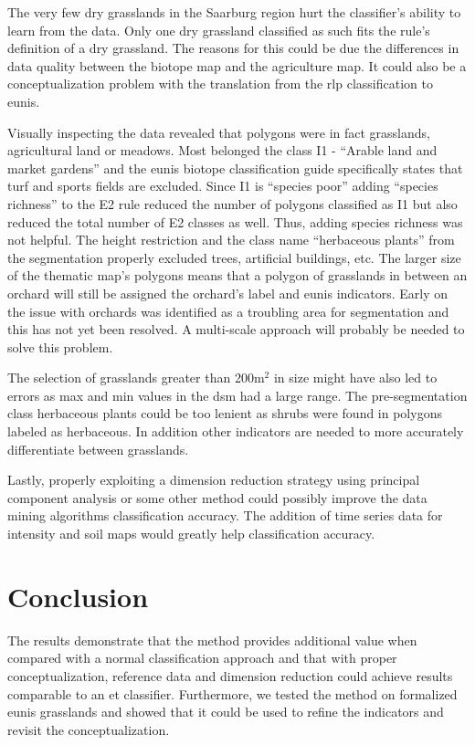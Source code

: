 \documentclass[authoryear,review,12pt,number]{elsarticle}
\begin{document}
The very few dry grasslands in the Saarburg region hurt the classifier's 
ability to learn from the data. Only one dry grassland classified as such fits 
the rule's definition of a dry grassland. The reasons for this could be due the 
differences in data quality between the biotope map and the agriculture map. 
It could also be a conceptualization problem with the translation from the 
\gls{rlp} classification to \gls{eunis}.

Visually inspecting the data revealed that polygons were in fact grasslands, 
agricultural land or meadows. Most belonged the class I1 - ``Arable land and 
market gardens'' and the \gls{eunis} biotope classification guide specifically 
states that turf and sports fields are excluded. Since I1 is ``species poor'' 
adding ``species richness'' to the E2 rule reduced the number of polygons 
classified as I1 but also reduced the total number of E2 classes as well. Thus, 
adding species richness was not helpful. The height restriction and the class 
name ``herbaceous plants'' from the segmentation properly excluded trees, 
artificial buildings, etc. The larger size of the thematic map's polygons means 
that a polygon of grasslands in between an orchard will still be assigned the 
orchard's label and \gls{eunis} indicators. Early on the issue with orchards 
was identified as a troubling area for segmentation and this has not yet been 
resolved. A multi-scale approach will probably be needed to solve this problem. 

The selection of grasslands greater than 200m$^{2}$ in size might have also led 
to errors as max and min values in the \gls{dsm} had a large range. The 
pre-segmentation class herbaceous plants could be too lenient as shrubs were 
found in polygons labeled as herbaceous. In addition other indicators are 
needed to more accurately differentiate between grasslands.

Lastly, properly exploiting a dimension reduction strategy using principal 
component analysis or some other method could possibly improve the data mining 
algorithms classification accuracy. The addition of time series data for 
intensity and soil maps would greatly help classification accuracy.
\section{Conclusion}
The results demonstrate that the method provides additional value when compared 
with a normal classification approach and that with proper conceptualization, 
reference data and dimension reduction could achieve results comparable to an 
\gls{et} classifier. Furthermore, we tested the method on formalized 
\gls{eunis} grasslands and showed that it could be used to refine the 
indicators and revisit the conceptualization. 
\end{document}
